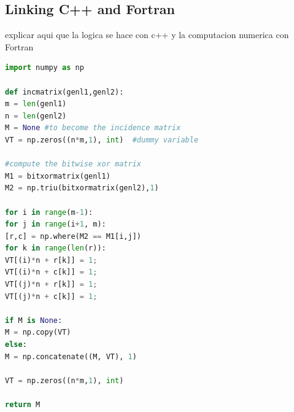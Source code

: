\subsection{Linking C++ and Fortran}

explicar aqui que la logica se hace con c++ y la computacion numerica con Fortran

\begin{lstlisting}[language=Python, caption=Python example]
import numpy as np

def incmatrix(genl1,genl2):
m = len(genl1)
n = len(genl2)
M = None #to become the incidence matrix
VT = np.zeros((n*m,1), int)  #dummy variable

#compute the bitwise xor matrix
M1 = bitxormatrix(genl1)
M2 = np.triu(bitxormatrix(genl2),1) 

for i in range(m-1):
for j in range(i+1, m):
[r,c] = np.where(M2 == M1[i,j])
for k in range(len(r)):
VT[(i)*n + r[k]] = 1;
VT[(i)*n + c[k]] = 1;
VT[(j)*n + r[k]] = 1;
VT[(j)*n + c[k]] = 1;

if M is None:
M = np.copy(VT)
else:
M = np.concatenate((M, VT), 1)

VT = np.zeros((n*m,1), int)

return M
\end{lstlisting}